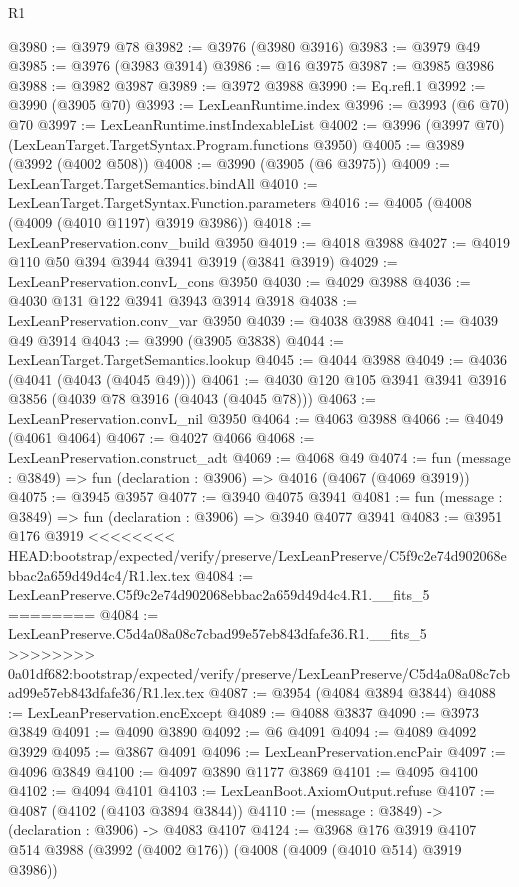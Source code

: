 \begin{lexlean}{R1}
\begin{coremodule}
{{{{{{{{{{{{{{{{{{{{{{{{{{{{{{{{{{{{{{{{{{{{{{{{{{{{{{{{{{{{{{{{{{{{{{{{{{{{{{{{{{{{{{{{{{{{{{{{{{{{{{{{{{{{{{{{{{{{{{{{{{{{{{{{{{{{{{{{{{{{{{{{{{{{{{{{{{{{{{{{{{{{{{{{{{{{{{{{{{{{{{{{{{@3980 := @3979 @78
@3982 := @3976 (@3980 @3916)
@3983 := @3979 @49
@3985 := @3976 (@3983 @3914)
@3986 := @16 @3975
@3987 := @3985 @3986
@3988 := @3982 @3987
@3989 := @3972 @3988
@3990 := Eq.refl.{1}
@3992 := @3990 (@3905 @70)
@3993 := LexLeanRuntime.index
@3996 := @3993 (@6 @70) @70
@3997 := LexLeanRuntime.instIndexableList
@4002 := @3996 (@3997 @70) (LexLeanTarget.TargetSyntax.Program.functions @3950)
@4005 := @3989 (@3992 (@4002 @508))
@4008 := @3990 (@3905 (@6 @3975))
@4009 := LexLeanTarget.TargetSemantics.bindAll
@4010 := LexLeanTarget.TargetSyntax.Function.parameters
@4016 := @4005 (@4008 (@4009 (@4010 @1197) @3919 @3986))
@4018 := LexLeanPreservation.conv_build @3950
@4019 := @4018 @3988
@4027 := @4019 @110 @50 @394 @3944 @3941 @3919 (@3841 @3919)
@4029 := LexLeanPreservation.convL_cons @3950
@4030 := @4029 @3988
@4036 := @4030 @131 @122 @3941 @3943 @3914 @3918
@4038 := LexLeanPreservation.conv_var @3950
@4039 := @4038 @3988
@4041 := @4039 @49 @3914
@4043 := @3990 (@3905 @3838)
@4044 := LexLeanTarget.TargetSemantics.lookup
@4045 := @4044 @3988
@4049 := @4036 (@4041 (@4043 (@4045 @49)))
@4061 := @4030 @120 @105 @3941 @3941 @3916 @3856 (@4039 @78 @3916 (@4043 (@4045 @78)))
@4063 := LexLeanPreservation.convL_nil @3950
@4064 := @4063 @3988
@4066 := @4049 (@4061 @4064)
@4067 := @4027 @4066
@4068 := LexLeanPreservation.construct_adt
@4069 := @4068 @49
@4074 := fun (message : @3849) => fun (declaration : @3906) => @4016 (@4067 (@4069 @3919))
@4075 := @3945 @3957
@4077 := @3940 @4075 @3941
@4081 := fun (message : @3849) => fun (declaration : @3906) => @3940 @4077 @3941
@4083 := @3951 @176 @3919
<<<<<<<< HEAD:bootstrap/expected/verify/preserve/LexLeanPreserve/C5f9c2e74d902068ebbac2a659d49d4c4/R1.lex.tex
@4084 := LexLeanPreserve.C5f9c2e74d902068ebbac2a659d49d4c4.R1.__fits_5
========
@4084 := LexLeanPreserve.C5d4a08a08c7cbad99e57eb843dfafe36.R1.__fits_5
>>>>>>>> 0a01df682:bootstrap/expected/verify/preserve/LexLeanPreserve/C5d4a08a08c7cbad99e57eb843dfafe36/R1.lex.tex
@4087 := @3954 (@4084 @3894 @3844)
@4088 := LexLeanPreservation.encExcept
@4089 := @4088 @3837
@4090 := @3973 @3849
@4091 := @4090 @3890
@4092 := @6 @4091
@4094 := @4089 @4092 @3929
@4095 := @3867 @4091
@4096 := LexLeanPreservation.encPair
@4097 := @4096 @3849
@4100 := @4097 @3890 @1177 @3869
@4101 := @4095 @4100
@4102 := @4094 @4101
@4103 := LexLeanBoot.AxiomOutput.refuse
@4107 := @4087 (@4102 (@4103 @3894 @3844))
@4110 := (message : @3849) -> (declaration : @3906) -> @4083 @4107
@4124 := @3968
    @176
    @3919
    @4107
    @514
    @3988
    (@3992 (@4002 @176))
    (@4008 (@4009 (@4010 @514) @3919 @3986))
}}}}}}}}}}}}}}}}}}}}}}}}}}}}}}}}}}}}}}}}}}}}}}}}}}}}}}}}}}}}}}}}}}}}}}}}}}}}}}}}}}}}}}}}}}}}}}}}}}}}}}}}}}}}}}}}}}}}}}}}}}}}}}}}}}}}}}}}}}}}}}}}}}}}}}}}}}}}}}}}}}}}}}}}}}}}}}}}}}}}}}}}}}
\end{coremodule}
\end{lexlean}
